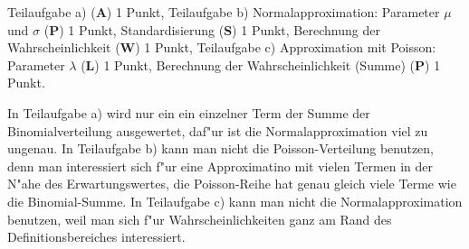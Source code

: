 \begin{bewertung}
Teilaufgabe a) ({\bf A}) 1 Punkt,
Teilaufgabe b) Normalapproximation:
Parameter $\mu$ und $\sigma$ ({\bf P}) 1 Punkt,
Standardisierung ({\bf S}) 1 Punkt,
Berechnung der Wahrscheinlichkeit ({\bf W}) 1 Punkt,
Teilaufgabe c) Approximation mit Poisson: Parameter $\lambda$ ({\bf L}) 1 Punkt,
Berechnung der Wahrscheinlichkeit (Summe) ({\bf P}) 1 Punkt.
\end{bewertung}

\begin{diskussion}
In Teilaufgabe a) wird nur ein ein einzelner Term der Summe der
Binomialverteilung ausgewertet, daf"ur ist die Normalapproximation viel
zu ungenau.
In Teilaufgabe b) kann man nicht die Poisson-Verteilung benutzen, denn
man interessiert sich f"ur eine Approximatino mit vielen Termen in der
N"ahe des Erwartungswertes, die Poisson-Reihe hat genau gleich viele
Terme wie die Binomial-Summe.
In Teilaufgabe c) kann man nicht die Normalapproximation benutzen, weil
man sich f"ur Wahrscheinlichkeiten ganz am Rand des Definitionsbereiches
interessiert.
\end{diskussion}
